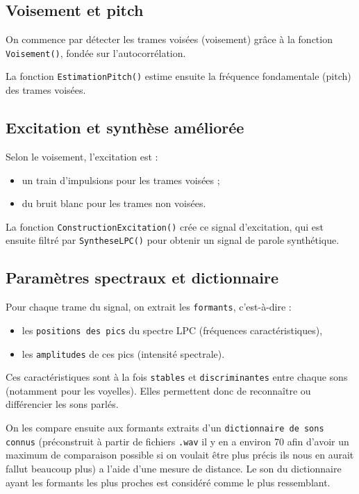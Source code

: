 \documentclass[11pt]{article}
\begin{document}
\subsection{Voisement et pitch}

On commence par détecter les trames voisées (voisement) grâce à la fonction \texttt{Voisement()}, fondée sur l’autocorrélation.

La fonction \texttt{EstimationPitch()} estime ensuite la fréquence fondamentale (pitch) des trames voisées.

\subsection{Excitation et synthèse améliorée}

Selon le voisement, l’excitation est :
\begin{itemize}
    \item un train d’impulsions pour les trames voisées ;
    \item du bruit blanc pour les trames non voisées.
\end{itemize}

La fonction \texttt{ConstructionExcitation()} crée ce signal d’excitation, qui est ensuite filtré par \texttt{SyntheseLPC()} pour obtenir un signal de parole synthétique.

\subsection{Paramètres spectraux et dictionnaire}

Pour chaque trame du signal, on extrait les \texttt{formants}, c’est-à-dire :
\begin{itemize}
\item les 	\texttt{positions des pics} du spectre LPC (fréquences caractéristiques),
\item les \texttt{amplitudes} de ces pics (intensité spectrale).
\end{itemize}

Ces caractéristiques sont à la fois \texttt{stables} et 	\texttt{discriminantes} entre chaque sons (notamment pour les voyelles). Elles permettent donc de reconnaître ou différencier les sons parlés.\newline

On les compare ensuite aux formants extraits d’un \texttt{dictionnaire de sons connus} (préconstruit à partir de fichiers \texttt{.wav} il y en a environ 70 afin d'avoir un maximum de comparaison possible si on voulait être plus précis ils nous en aurait fallut beaucoup plus) a l'aide d'une mesure de distance. Le son du dictionnaire ayant les formants les plus proches est considéré comme le plus ressemblant. \newline
\\
\end{document}

